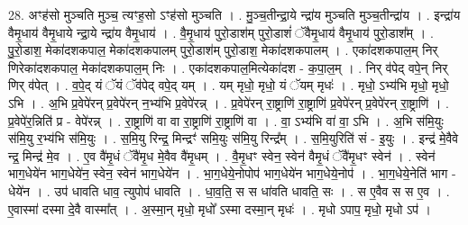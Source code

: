 \documentclass[17pt]{extarticle}
\begin{document}
28. अꣳह॑सो मुञ्चति मुञ्च॒ त्यꣳह॒सो ऽꣳह॑सो मुञ्चति । . मु॒ञ्च॒तीन्द्रा॒ये न्द्रा॑य मुञ्चति मुञ्च॒तीन्द्रा॑य । . इन्द्रा॑य वैमृ॒धाय॑ वैमृ॒धाये न्द्रा॒ये न्द्रा॑य वैमृ॒धाय॑ । . वै॒मृ॒धाय॑ पुरो॒डाश॑म् पुरो॒डाशं॑ ॅवैमृ॒धाय॑ वैमृ॒धाय॑ पुरो॒डाश᳚म् । . पु॒रो॒डाश॒ मेका॑दशकपाल॒ मेका॑दशकपालम् पुरो॒डाश॑म् पुरो॒डाश॒ मेका॑दशकपालम् । . एका॑दशकपाल॒म् निर् णिरेका॑दशकपाल॒ मेका॑दशकपाल॒म् निः । . एका॑दशकपाल॒मित्येका॑दश - क॒पा॒ल॒म् । . निर् व॑पेद् वपे॒न् निर् णिर् व॑पेत् । . व॒पे॒द् यं ॅयं ॅव॑पेद् वपे॒द् यम् । . यम् मृधो॒ मृधो॒ यं ॅयम् मृधः॑ । . मृधो॒ ऽभ्य॑भि मृधो॒ मृधो॒ ऽभि । . अ॒भि प्र॒वेपे॑रन् प्र॒वेपे॑रन् न॒भ्य॑भि प्र॒वेपे॑रन्न् । . प्र॒वेपे॑रन् रा॒ष्ट्राणि॑ रा॒ष्ट्राणि॑ प्र॒वेपे॑रन् प्र॒वेपे॑रन् रा॒ष्ट्राणि॑ । . प्र॒वेपे॑र॒न्निति॑ प्र - वेपे॑रन्न् । . रा॒ष्ट्राणि॑ वा वा रा॒ष्ट्राणि॑ रा॒ष्ट्राणि॑ वा । . वा॒ ऽभ्य॑भि वा॑ वा॒ ऽभि । . अ॒भि स॑मि॒युः स॑मि॒यु र॒भ्य॑भि स॑मि॒युः । . स॒मि॒यु रिन्द्र॒ मिन्द्रꣳ॑ समि॒युः स॑मि॒यु रिन्द्र᳚म् । . स॒मि॒युरिति॑ सं - इ॒युः । . इन्द्र॑ मे॒वैवे न्द्र॒ मिन्द्र॑ मे॒व । . ए॒व वै॑मृ॒धं ॅवै॑मृ॒ध मे॒वैव वै॑मृ॒धम् । . वै॒मृ॒धꣳ स्वेन॒ स्वेन॑ वैमृ॒धं ॅवै॑मृ॒धꣳ स्वेन॑ । . स्वेन॑ भाग॒धेये॑न भाग॒धेये॑न॒ स्वेन॒ स्वेन॑ भाग॒धेये॑न । . भा॒ग॒धेये॒नोपोप॑ भाग॒धेये॑न भाग॒धेये॒नोप॑ । . भा॒ग॒धेये॒नेति॑ भाग - धेये॑न । . उप॑ धावति धाव॒ त्युपोप॑ धावति । . धा॒व॒ति॒ स स धा॑वति धावति॒ सः । . स ए॒वैव स स ए॒व । . ए॒वास्मा॑ दस्मा दे॒वै वास्मा᳚त् । . अ॒स्मा॒न् मृधो॒ मृधो᳚ ऽस्मा दस्मा॒न् मृधः॑ । . मृधो ऽपाप॒ मृधो॒ मृधो ऽप॑ । \newline
\end{document}
